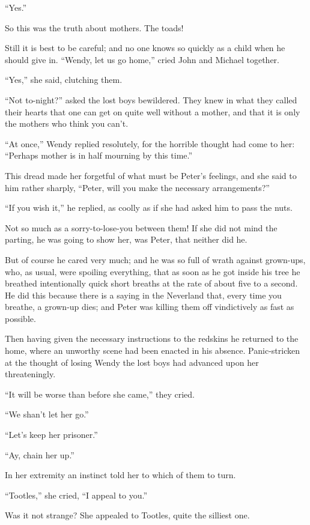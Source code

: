 “Yes.”

So this was the truth about mothers.
The toads!

Still it is best to be careful;
and no one knows so quickly as a child when he should give in.
“Wendy, let us go home,” cried John and Michael together.

“Yes,” she said, clutching them.

“Not to-night?\@” asked the lost boys bewildered.
They knew in what they called their hearts that one can get on quite well without a mother,
and that it is only the mothers who think you can’t.

“At once,” Wendy replied resolutely,
for the horrible thought had come to her:
“Perhaps mother is in half mourning by this time.”

This dread made her forgetful of what must be Peter’s feelings,
and she said to him rather sharply, “Peter, will you make the necessary arrangements?”

“If you wish it,” he replied, as coolly as if she had asked him to pass the nuts.

Not so much as a sorry-to-lose-you between them!
If she did not mind the parting, he was going to show her, was Peter, that neither did he.

But of course he cared very much;
and he was so full of wrath against grown-ups,
who, as usual, were spoiling everything,
that as soon as he got inside his tree he breathed intentionally quick short breaths
at the rate of about five to a second.
He did this because there is a saying in the Neverland that, every time you breathe, a grown-up dies;
and Peter was killing them off vindictively as fast as possible.

Then having given the necessary instructions to the redskins he returned to the home,
where an unworthy scene had been enacted in his absence.
Panic-stricken at the thought of losing Wendy the lost boys had advanced upon her threateningly.

“It will be worse than before she came,” they cried.

“We shan’t let her go.”

“Let’s keep her prisoner.”

“Ay, chain her up.”

In her extremity an instinct told her to which of them to turn.

“Tootles,” she cried, “I appeal to you.”

Was it not strange?
She appealed to Tootles, quite the silliest one.

